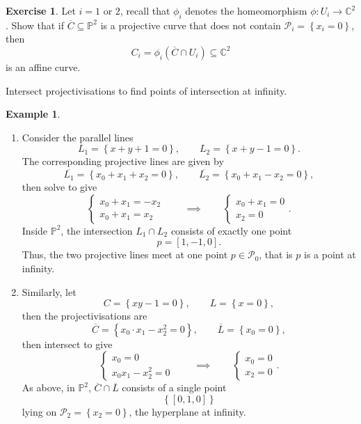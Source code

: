 \documentclass{article}
\newcommand{\C}{\mathbb{C}}
\renewcommand{\P}{\mathbb{P}}
\newcommand{\rb}[1]{\left( #1 \right)}
\renewcommand{\sb}[1]{\left[ #1 \right]}
\newcommand{\cb}[1]{\left\{ #1 \right\}}
\theoremstyle{definition}\newtheorem{definition}{Definition}[section]
\theoremstyle{definition}\newtheorem{notation}[definition]{Notation}
\theoremstyle{definition}\newtheorem{remark}[definition]{Remark}
\theoremstyle{definition}\newtheorem{example}[definition]{Example}
\theoremstyle{definition}\newtheorem{fact}{Fact}
\theoremstyle{definition}\newtheorem{exercise}{Exercise}
\begin{document}
\begin{exercise}
Let $ i = 1 $ or $ 2 $, recall that $ \phi_i $ denotes the homeomorphism $ \phi : U_i \to \C^2 $. Show that if $ \overline{C} \subseteq \P^2 $ is a projective curve that does not contain $ \mathcal{P}_i = \cb{x_i = 0} $, then
$$ C_i = \phi_i\rb{\overline{C} \cap U_i} \subseteq \C^2 $$
is an affine curve.
\end{exercise}


Intersect projectivisations to find points of intersection at infinity.

\begin{example}
\hfill
\begin{enumerate}
\item Consider the parallel lines
$$ L_1 = \cb{x + y + 1 = 0}, \qquad L_2 = \cb{x + y - 1 = 0}. $$
The corresponding projective lines are given by
$$ \overline{L_1} = \cb{x_0 + x_1 + x_2 = 0}, \qquad \overline{L_2} = \cb{x_0 + x_1 - x_2 = 0}, $$
then solve to give
$$ \begin{cases} x_0 + x_1 = -x_2 \\ x_0 + x_1 = x_2 \end{cases} \qquad \implies \qquad \begin{cases} x_0 + x_1 = 0 \\ x_2 = 0 \end{cases}. $$
Inside $ \P^2 $, the intersection $ L_1 \cap L_2 $ consists of exactly one point
$$ p = \sb{1, -1, 0}. $$
Thus, the two projective lines meet at one point $ p \in \mathcal{P}_0 $, that is $ p $ is a point at infinity.
\item Similarly, let
$$ C = \cb{xy - 1 = 0}, \qquad L = \cb{x = 0}, $$
then the projectivisations are
$$ \overline{C} = \cb{x_0 \cdot x_1 - x_2^2 = 0}, \qquad \overline{L} = \cb{x_0 = 0}, $$
then intersect to give
$$ \begin{cases} x_0 = 0 \\ x_0x_1 - x_2^2 = 0 \end{cases} \qquad \implies \qquad \begin{cases} x_0 = 0 \\ x_2 = 0 \end{cases}. $$
As above, in $ \P^2 $, $ \overline{C} \cap \overline{L} $ consists of a single point
$$ \cb{\sb{0, 1, 0}} $$
lying on $ \mathcal{P}_2 = \cb{x_2 = 0} $, the hyperplane at infinity.
\end{enumerate}
\end{example}
\end{document}
